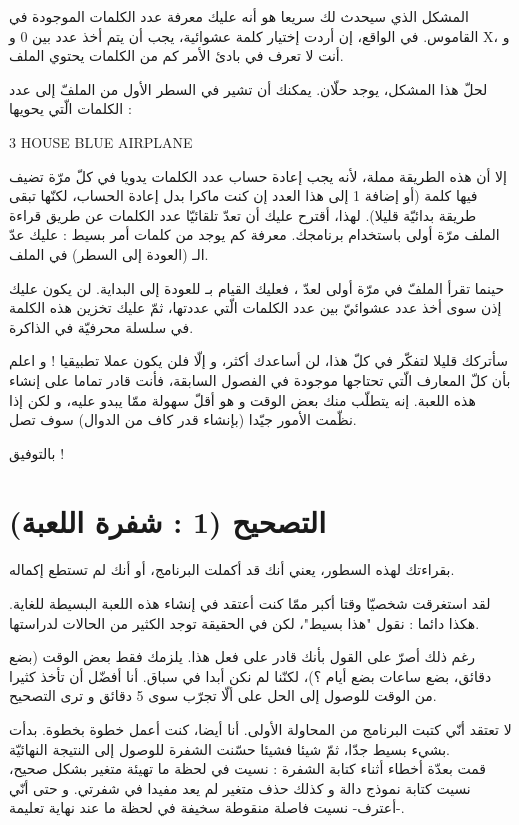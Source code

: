 المشكل الذي سيحدث لك سريعا هو أنه عليك معرفة عدد الكلمات الموجودة في القاموس. في الواقع، إن أردت إختيار كلمة عشوائية، يجب أن يتم أخذ عدد بين 0 و
\textenglish{X}،
و أنت لا تعرف في بادئ الأمر كم من الكلمات يحتوي الملف.

لحلّ هذا المشكل، يوجد حلّان. يمكنك أن تشير في السطر الأول من الملفّ إلى عدد الكلمات الّتي يحويها :

\begin{Console}
3
HOUSE
BLUE
AIRPLANE
\end{Console}

إلا أن هذه الطريقة مملة، لأنه يجب إعادة حساب عدد الكلمات يدويا في كلّ مرّة تضيف فيها كلمة (أو إضافة 1 إلى هذا العدد إن كنت ماكرا بدل إعادة الحساب، لكنّها تبقى طريقة بدائيّة قليلا). لهذا، أقترح عليك أن تعدّ تلقائيّا عدد الكلمات عن طريق قراءة الملف مرّة أولى باستخدام برنامجك. معرفة كم يوجد من كلمات أمر بسيط : عليك عدّ الـ
(العودة إلى السطر) في الملف.

حينما تقرأ الملفّ في مرّة أولى لعدّ
،
فعليك القيام بـ
للعودة إلى البداية. لن يكون عليك إذن سوى أخذ عدد عشوائيّ بين عدد الكلمات الّتي عددتها، ثمّ عليك تخزين هذه الكلمة في سلسلة محرفيّة في الذاكرة.

سأتركك قليلا لتفكّر في كلّ هذا، لن أساعدك أكثر، و إلّا فلن يكون عملا تطبيقيا ! و اعلم بأن  كلّ المعارف الّتي تحتاجها موجودة في الفصول السابقة، فأنت قادر تماما على إنشاء هذه اللعبة. إنه يتطلّب منك بعض الوقت و هو أقلّ سهولة ممّا يبدو عليه، و لكن إذا نظّمت الأمور جيّدا (بإنشاء قدر كاف من الدوال) سوف تصل.

بالتوفيق !

\section{التصحيح (1 : شفرة اللعبة)}
بقراءتك لهذه السطور، يعني أنك قد أكملت البرنامج، أو أنك لم تستطع إكماله.

لقد استغرقت شخصيّا وقتا أكبر ممّا كنت أعتقد في إنشاء هذه اللعبة البسيطة للغاية. هكذا دائما : نقول "هذا بسيط"، لكن في الحقيقة توجد الكثير من الحالات لدراستها.

رغم ذلك أصرّ على القول بأنك قادر على فعل هذا. يلزمك فقط بعض الوقت (بضع دقائق، بضع ساعات بضع أيام ؟)، لكنّنا لم نكن أبدا في سباق. أنا أفضّل أن تأخذ كثيرا من الوقت للوصول إلى الحل على ألّا تجرّب سوى 5 دقائق و ترى التصحيح.

لا تعتقد أنّي كتبت البرنامج من المحاولة الأولى. أنا أيضا، كنت أعمل خطوة بخطوة. بدأت بشيء بسيط جدّا، ثمّ شيئا فشيئا حسّنت الشفرة للوصول إلى النتيجة النهائيّة.\\
قمت بعدّة أخطاء أثناء كتابة الشفرة : نسيت في لحظة ما تهيئة متغير بشكل صحيح، نسيت كتابة نموذج دالة و كذلك حذف متغير لم يعد مفيدا في شفرتي. و حتى أنّي -أعترف- نسيت فاصلة منقوطة سخيفة في لحظة ما عند نهاية تعليمة.


